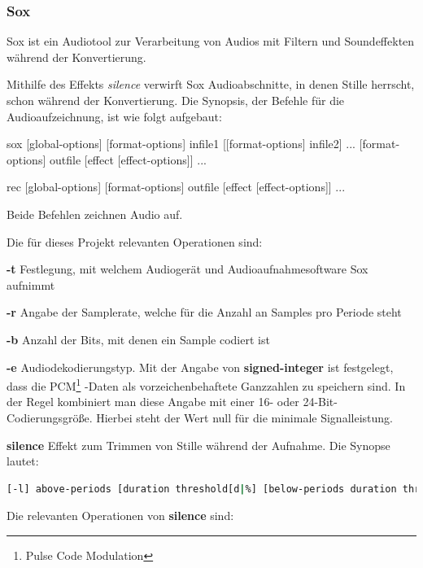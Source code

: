    
\subsubsection{Sox}
\label{subsubsec:sox}
Sox ist ein Audiotool zur Verarbeitung von Audios mit Filtern und Soundeffekten während der Konvertierung.

Mithilfe des Effekts \textit{silence} verwirft Sox Audioabschnitte, in denen Stille herrscht, schon während der Konvertierung. 
Die Synopsis, der Befehle für die Audioaufzeichnung, ist wie folgt aufgebaut:

    
    sox [global-options] [format-options] infile1 [[format-options] infile2] ... [format-options] outfile [effect [effect-options]] ...

rec [global-options] [format-options] outfile [effect [effect-options]] ...



Beide Befehlen zeichnen Audio auf. 

Die für dieses Projekt relevanten Operationen sind:

\textbf{-t} Festlegung, mit welchem Audiogerät und Audioaufnahmesoftware Sox aufnimmt

\textbf{-r} Angabe der Samplerate, welche für die Anzahl an Samples pro Periode steht

\textbf{-b} Anzahl der Bits, mit denen ein Sample codiert ist

\textbf{-e} Audiodekodierungstyp. 
 Mit der Angabe von \textbf{signed-integer} ist festgelegt, dass die PCM\footnote{Pulse Code Modulation} %
 -Daten als vorzeichenbehaftete Ganzzahlen zu speichern sind. In der Regel kombiniert man diese Angabe mit einer 16- oder 24-Bit-Codierungsgröße. Hierbei steht der Wert null für die minimale Signalleistung.


\textbf{silence} Effekt zum Trimmen von Stille während der Aufnahme. 
Die Synopse lautet:

\begin{lstlisting}[language=bash,caption={Synopse für den Befehl von Stille während der Konvertierung},]
[-l] above-periods [duration threshold[d|%] [below-periods duration threshold[d|%]]
\end{lstlisting}
Die relevanten Operationen von \textbf{silence} sind: %

